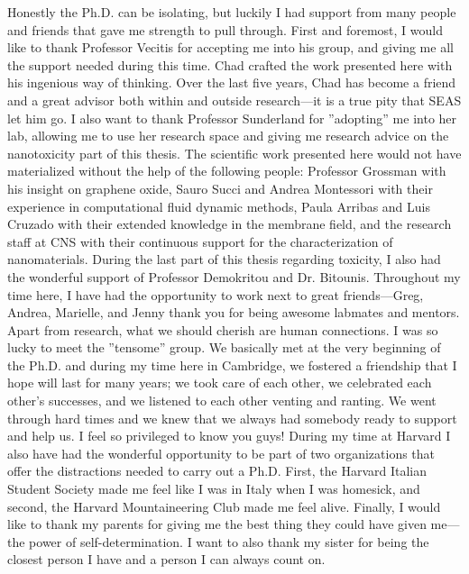 Honestly the Ph.D. can be isolating, but luckily I had support from many people and friends that gave me strength to pull through.
First and foremost, I would like to thank Professor Vecitis for accepting me into his group, and giving me all the support needed during this time. Chad crafted the work presented here with his ingenious way of thinking. Over the last five years, Chad has become a friend and a great advisor both within and outside research---it is a true pity that SEAS let him go. I also want to thank Professor Sunderland for ''adopting'' me into her lab, allowing me to use her research space and giving me research advice on the nanotoxicity part of this thesis. The scientific work presented here would not have materialized without the help of the following people: Professor Grossman with his insight on graphene oxide, Sauro Succi and Andrea Montessori with their experience in computational fluid dynamic methods, Paula Arribas and Luis Cruzado with their extended knowledge in the membrane field, and the research staff at CNS with their continuous support for the characterization of nanomaterials. During the last part of this thesis regarding toxicity, I also had the wonderful support of Professor Demokritou and Dr. Bitounis. Throughout my time here, I have had the opportunity to work next to great friends---Greg, Andrea, Marielle, and Jenny thank you for being awesome labmates and mentors.\\
Apart from research, what we should cherish are human connections. I was so lucky to meet the ''tensome'' group. We basically met at the very beginning of the Ph.D. and during my time here in Cambridge, we fostered a friendship that I hope will last for many years; we took care of each other, we celebrated each other's successes, and we listened to each other venting and ranting. We went through hard times and we knew that we always had somebody ready to support and help us. I feel so privileged to know you guys! During my time at Harvard I also have had the wonderful opportunity to be part of two organizations that offer the distractions needed to carry out a Ph.D. First, the Harvard Italian Student Society made me feel like I was in Italy when I was homesick, and second, the Harvard Mountaineering Club made me feel alive. 
Finally, I would like to thank my parents for giving me the best thing they could have given me---the power of self-determination. I want to also thank my sister for being the closest person I have and a person I can always count on.

